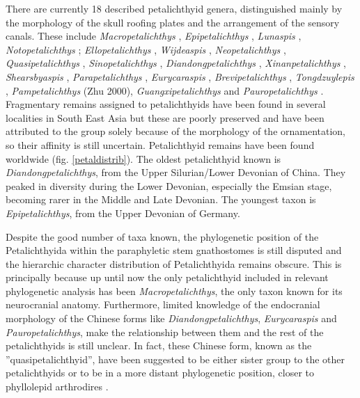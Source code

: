 \documentclass[11pt,letterpaper]{report}
\begin{document}
There are currently 18 described petalichthyid genera, distinguished mainly by the morphology of the skull roofing plates and the arrangement of the sensory canals. These include \textit{Macropetalichthys} \citep{Norwood1846}, \textit{Epipetalichthys} \citep{Stensi1950}, \textit{Lunaspis} \citep{broili1929}, \textit{Notopetalichthys} \citep{Woodward1941}; \textit{Ellopetalichthys} \citep{Ørvig1957}, \textit{Wijdeaspis} \citep{obruchev1964class}, \textit{Neopetalichthys} \citep{Liu1973}, \textit{Quasipetalichthys} \citep{Liu1973}, \textit{Sinopetalichthys} \citep{p1975lower}, \textit{Diandongpetalichthys} \citep{p1978devonian}, \textit{Xinanpetalichthys} \citep{p1978devonian}, \textit{Shearsbyaspis} \citep{Young1985}, \textit{Parapetalichthys} \citep{wang1988}, \textit{Eurycaraspis} \citep{Liu1991}, \textit{Brevipetalichthys} \citep{Ji1996}, \textit{Tongdzuylepis} \citep{Vietnam}, \textit{Pampetalichthys} \citep{Zhu2000}(Zhu 2000), \textit{Guangxipetalichthys} \citep{Zhu2000} and \textit{Pauropetalichthys} \citep{pan2015new}. Fragmentary remains assigned to petalichthyids have been found in several localities in South East Asia \citep{Wang2010} but these are poorly preserved and have been attributed to the group solely because of the morphology of the ornamentation, so their affinity is still uncertain. Petalichthyid remains have been found worldwide (fig. \ref{petaldistrib}). The oldest petalichthyid known is \textit{Diandongpetalichthys}, from the Upper Silurian/Lower Devonian of China. They peaked in diversity during the Lower Devonian, especially the Emsian stage, becoming rarer in the Middle and Late Devonian. The youngest taxon is \textit{Epipetalichthys}, from the Upper Devonian of Germany.

Despite the good number of taxa known, the phylogenetic position of the Petalichthyida within the paraphyletic stem gnathostomes is still disputed and the hierarchic character distribution of Petalichthyida remains obscure. This is principally because up until now the only petalichthyid included in relevant phylogenetic analysis has been \textit{Macropetalichthys}, the only taxon known for its neurocranial anatomy. Furthermore, limited knowledge of the endocranial morphology of the Chinese forms like \textit{Diandongpetalichthys}, \textit{Eurycaraspis} and \textit{Pauropetalichthys}, make the relationship between them and the rest of the petalichthyids is still unclear. In fact, these Chinese form, known as the ''quasipetalichthyid'', have been suggested to be either sister group to the other petalichthyids \citep{Zhu1996a,pan2015new} or to be in a more distant phylogenetic position, closer to phyllolepid arthrodires \citep{giles2015osteichthyan}.
\end{document}
